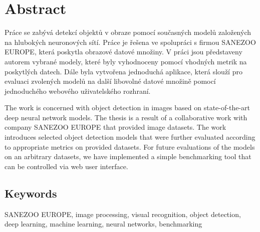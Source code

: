 \chapter*{Abstract}
\noindent

Práce se zabývá detekcí objektů v obraze pomocí současných modelů založených na
hlubokých neuronových sítí. Práce je řešena ve spolupráci s firmou SANEZOO
EUROPE, která poskytla obrazové datové množiny. V práci jsou představeny autorem
vybrané modely, které byly vyhodnoceny pomocí vhodných metrik na poskytlých
datech. Dále byla vytvořena jednoduchá aplikace, která slouží pro evaluaci
zvolených modelů na další libovolné datové množině pomocí jednoduchého webového
uživatelského rozhraní.

The work is concerned with object detection in images based on state-of-the-art
deep neural network models. The thesis is a result of a collaborative work with
company SANEZOO EUROPE that provided image datasets. The work introduces
selected object detection models that were further evaluated according to
appropriate metrics on provided datasets. For future evaluations of the models
on an arbitrary datasets, we have implemented a simple benchmarking tool that
can be controlled via web user interface.

\section*{Keywords}
\noindent
SANEZOO EUROPE, image processing, visual recognition, object detection, deep
learning, machine learning, neural networks, benchmarking
